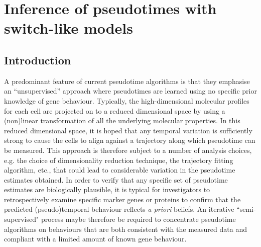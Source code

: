 \chapter{Inference of pseudotimes with switch-like models}\label{ch:ouijachap} %

\section{Introduction}


A predominant feature of current pseudotime algorithms is that they  emphasise an ``unsupervised''
 approach where pseudotimes are learned using no specific prior knowledge of gene behaviour. Typically, the high-dimensional molecular profiles for each cell are projected on to a reduced dimensional space by using a (non)linear transformation of all the underlying molecular properties. In this reduced dimensional space, it is hoped that any temporal variation is sufficiently strong to cause the cells to align against a trajectory along which pseudotime can be measured. This approach is therefore subject to a number of analysis choices, e.g. the choice of dimensionality reduction technique, the trajectory fitting algorithm, etc., that could lead to considerable variation in the pseudotime estimates obtained. In order to verify that any specific set of pseudotime estimates are biologically plausible, it is typical for investigators to retrospectively examine specific marker genes or proteins to confirm that the predicted (pseudo)temporal behaviour reflects \emph{a priori} beliefs. An iterative ``semi-supervised" process maybe therefore be required to concentrate pseudotime algorithms on behaviours that are both consistent with the measured data and compliant with a limited amount of known gene behaviour.

